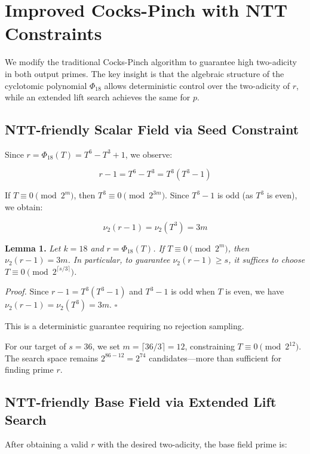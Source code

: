 \section{Improved Cocks-Pinch with NTT Constraints}

We modify the traditional Cocks-Pinch algorithm to guarantee high
two-adicity in both output primes. The key insight is that the algebraic
structure of the cyclotomic polynomial \(\Phi_{18}\) allows
deterministic control over the two-adicity of \(r\), while an extended
lift search achieves the same for \(p\).

\subsection{NTT-friendly Scalar Field via Seed
Constraint}\label{ntt-friendly-scalar-field-via-seed-constraint}

Since \(r = \Phi_{18}(T) = T^6 - T^3 + 1\), we observe:

\[r - 1 = T^6 - T^3 = T^3(T^3 - 1)\]

If \(T \equiv 0 \pmod{2^m}\), then \(T^3 \equiv 0 \pmod{2^{3m}}\). Since
\(T^3 - 1\) is odd (as \(T^3\) is even), we obtain:

\[\nu_2(r - 1) = \nu_2(T^3) = 3m\]

\textbf{Lemma 1.} \emph{Let \(k=18\) and \(r = \Phi_{18}(T)\). If
\(T \equiv 0 \pmod{2^m}\), then \(\nu_2(r-1) = 3m\). In particular, to
guarantee \(\nu_2(r-1) \geq s\), it suffices to choose
\(T \equiv 0 \pmod{2^{\lceil s/3 \rceil}}\).}

\emph{Proof.} Since \(r - 1 = T^3(T^3 - 1)\) and \(T^3 - 1\) is odd when
\(T\) is even, we have \(\nu_2(r-1) = \nu_2(T^3) = 3m\). \(\square\)

This is a deterministic guarantee requiring no rejection sampling.

For our target of \(s = 36\), we set \(m = \lceil 36/3 \rceil = 12\),
constraining \(T \equiv 0 \pmod{2^{12}}\). The search space remains
\(2^{86-12} = 2^{74}\) candidates---more than sufficient for finding
prime \(r\).

\subsection{NTT-friendly Base Field via Extended Lift
Search}\label{ntt-friendly-base-field-via-extended-lift-search}

After obtaining a valid \(r\) with the desired two-adicity, the base
field prime is:

